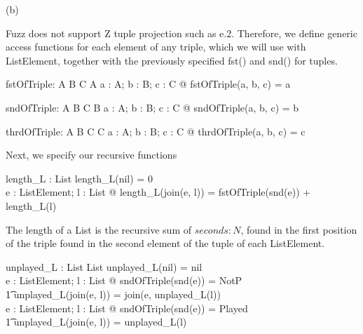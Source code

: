 \documentclass[a4paper,10pt,fleqn]{article}
\begin{document}
\setlength{\leftskip}{0pt}
\medskip

\noindent\hspace*{\parindent}(b)

\setlength{\leftskip}{\dimexpr\parindent+2em\relax}
\noindent Fuzz does not support Z tuple projection such as e.2. Therefore, we define generic access functions for each element of any triple, which we will use with ListElement, together with the previously specified fst() and snd() for tuples.

\bigskip


\bigskip

\setlength{\leftskip}{\dimexpr\parindent+2em\relax}
\begin{gendef}[A, B, C]
  fstOfTriple: A \cross B \cross C \fun A
\where
  \forall a : A; b : B; c : C @ fstOfTriple(a, b, c) = a
\end{gendef}

\begin{gendef}[A, B, C]
  sndOfTriple: A \cross B \cross C \fun B
\where
  \forall a : A; b : B; c : C @ sndOfTriple(a, b, c) = b
\end{gendef}

\begin{gendef}[A, B, C]
  thrdOfTriple: A \cross B \cross C \fun C
\where
  \forall a : A; b : B; c : C @ thrdOfTriple(a, b, c) = c
\end{gendef}

\noindent Next, we specify our recursive functions

\bigskip

\begin{axdef}
length\_L : List \fun \nat
\where
length\_L(nil) = 0 \\
\forall e : ListElement; l : List @ length\_L(join(e, l)) = fstOfTriple(snd(e)) + length\_L(l)
\end{axdef}

\noindent The length of a List is the recursive sum of $seconds : N$, found in the first position of the triple found in the second element of the tuple of each ListElement.

\bigskip

\begin{axdef}
unplayed\_L : List \fun List
\where
unplayed\_L(nil) = nil \\
\forall e : ListElement; l : List @ sndOfTriple(snd(e)) = NotP \implies \\
\t1 unplayed\_L(join(e, l)) = join(e, unplayed\_L(l)) \\
\forall e : ListElement; l : List @ sndOfTriple(snd(e)) = Played \implies \\
\t1 unplayed\_L(join(e, l)) = unplayed\_L(l)
\end{axdef}
\end{document}
